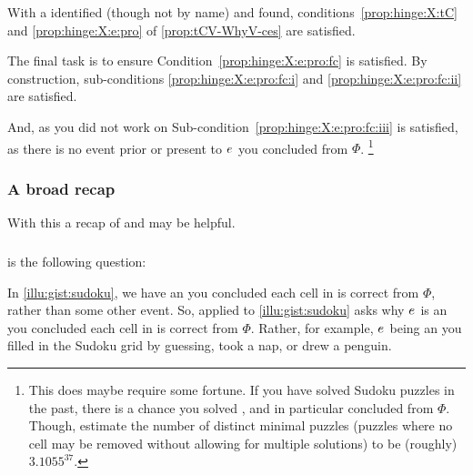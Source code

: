 \begin{note}
  With a \torNa{} identified (though not by name) and \tpro{} found, conditions~\ref{prop:hinge:X:tC} and \ref{prop:hinge:X:e:pro} of \autoref{prop:tCV-WhyV-ces} are satisfied.

  The final task is to ensure Condition~\ref{prop:hinge:X:e:pro:fc} is satisfied.
  By construction, sub-conditions \ref{prop:hinge:X:e:pro:fc:i} and \ref{prop:hinge:X:e:pro:fc:ii} are satisfied.

  And, as you did not work on \sudokuPuzR{} Sub-condition~\ref{prop:hinge:X:e:pro:fc:iii} is satisfied, as there is no event prior or present to \(e\sb{}\) \inwhich{} you concluded \sudokuRPV{} from \(\Phi\).%
  \footnote{
    This does maybe require some fortune.
    If you have solved Sudoku puzzles in the past, there is a chance you solved \sudokuPuzR{}, and in particular concluded \sudokuRPV{} from \(\Phi\).
    Though, \citeauthor{Berthier:2010aa} estimate the number of distinct minimal puzzles (puzzles where no cell may be removed without allowing for multiple solutions) to be (roughly) \(3.1055^{37}\).
  }
\end{note}



\subsubsection{A broad recap}


\begin{note}
  With this a recap of \qWhy{} and \qHow{} may be helpful.
\end{note}


\subparagraph*{\qWhy{}}


\begin{note}
  \qWhy{} is the following question:

\end{note}


\begin{note}
  In \autoref{illu:gist:sudoku}, we have an  you concluded each cell in \sudokuPuzL{} is correct from \(\Phi\), rather than some other event.
  So, \qWhy{} applied to \autoref{illu:gist:sudoku} asks why \(e\sb{}\) is an  you concluded each cell in \sudokuPuzL{} is correct from \(\Phi\).
  Rather, for example, \(e\sb{}\) being an  you filled in the Sudoku grid by guessing, took a nap, or drew a penguin.
\end{note}


